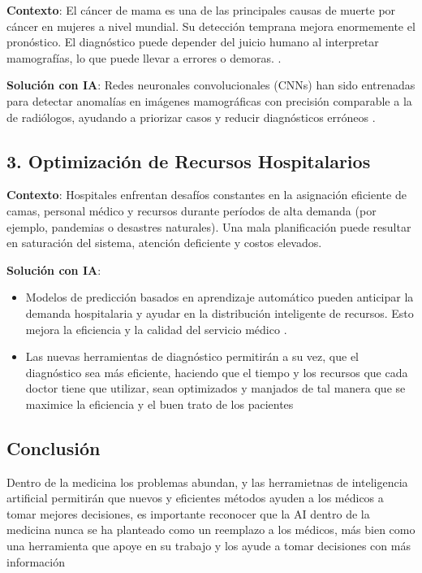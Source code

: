 \documentclass{article}
\begin{document}
\textbf{Contexto}: El cáncer de mama es una de las principales causas de muerte
por cáncer en mujeres a nivel mundial. Su detección temprana mejora enormemente
el pronóstico. El diagnóstico puede depender del juicio humano al
interpretar mamografías, lo que puede llevar a errores o demoras. \autocite{Luka2021}.

\textbf{Solución con IA}: Redes neuronales convolucionales (CNNs) han sido
entrenadas para detectar anomalías en imágenes mamográficas con precisión
comparable a la de radiólogos, ayudando a priorizar casos y reducir
diagnósticos erróneos \autocite{bcrf_ai_breast_cancer}.

\subsection*{3. Optimización de Recursos Hospitalarios}

\textbf{Contexto}: Hospitales enfrentan desafíos constantes en la asignación
eficiente de camas, personal médico y recursos durante períodos de alta demanda
(por ejemplo, pandemias o desastres naturales). Una mala planificación puede
resultar en saturación del sistema, atención deficiente y costos elevados.

\textbf{Solución con IA}:
\begin{itemize}
    \item Modelos de predicción basados en aprendizaje
    automático pueden anticipar la demanda hospitalaria y ayudar en la distribución
    inteligente de recursos. Esto mejora la eficiencia y la calidad del
    servicio médico \autocite{tribe_ai_hospital_resource}.
    \item Las nuevas herramientas de diagnóstico permitirán a su vez, que el diagnóstico
    sea más eficiente, haciendo que el tiempo y los recursos que cada doctor tiene
    que utilizar, sean optimizados y manjados de tal manera que se maximice la
    eficiencia y el buen trato de los pacientes
\end{itemize}
\subsection*{Conclusión}
Dentro de la medicina los problemas abundan, y las herramietnas de inteligencia artificial
permitirán que nuevos y eficientes métodos ayuden a los médicos a tomar mejores decisiones,
es importante reconocer que la AI dentro de la medicina nunca se ha planteado como un reemplazo
a los médicos, más bien como una herramienta que apoye en su trabajo y los ayude a tomar
decisiones con más información

\printbibliography
\end{document}
